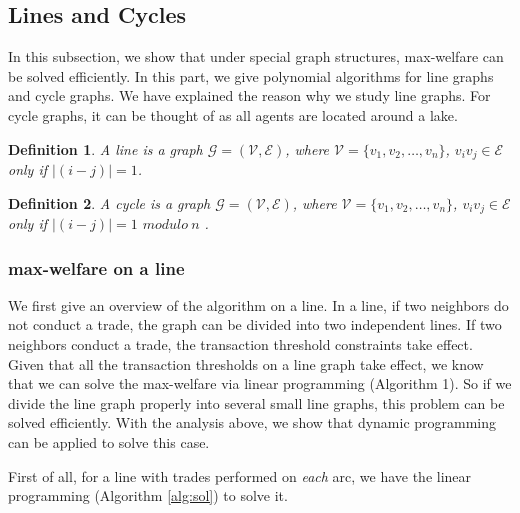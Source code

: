 \documentclass{aamas2015}
\newtheorem{definition}{Definition}
\begin{document}
\subsection{Lines and Cycles}
In this subsection, we show that under special graph structures, {\sc max-welfare} can be solved efficiently.
In this part, we give polynomial algorithms for line graphs and cycle graphs. We have explained the reason why we study line graphs. For cycle graphs, it can be thought of as all agents are located around a lake.  %


\begin{definition}
	A line is a graph $\mathcal{G}=(\mathcal{V},\mathcal{E})$, where $\mathcal{V}=\{v_1,v_2,\dots,v_n\}$, $v_iv_j\in \mathcal{E}$ only if $|(i-j)|=1$.
\end{definition}


\begin{definition}
	A cycle is a graph $\mathcal{G}=(\mathcal{V},\mathcal{E})$, where $\mathcal{V}=\{v_1,v_2,\dots,v_{n}\}$, $v_iv_j\in \mathcal{E}$ only if $|(i-j)|=1$ $modulo~n$ .
\end{definition}

\subsubsection{{\sc max-welfare} on a line}
We first give an overview of the algorithm on a line. In a line, if two neighbors do not conduct a trade, the graph can be divided into two independent lines.
If two neighbors conduct a trade, the transaction threshold constraints take effect.  Given that all the transaction thresholds on a line graph take effect, we know that we can solve the {\sc max-welfare} via linear programming (Algorithm 1).
So if we divide the line graph properly into several small line graphs, this problem can be solved efficiently.
With the analysis above, we show that dynamic programming can be applied to solve this case.

First of all, for a line with trades performed on {\em each} arc, we have the linear programming (Algorithm \ref{alg:sol}) to solve it.
\end{document}
